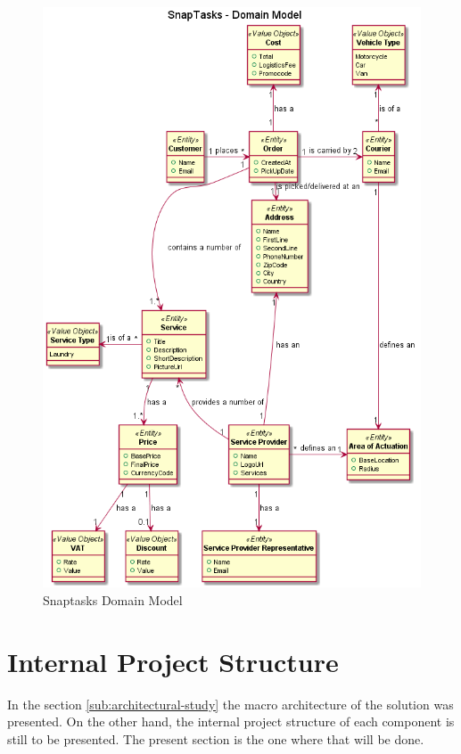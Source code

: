 \begin{figure}[ht]
\centering
\includegraphics[width=\textwidth,keepaspectratio]{chapters/Architectural_Overview/assets/SnapTasks-DomainModel.png}
\caption[SnapTasks Domain Model]{Snaptasks Domain Model}
\label{fig:domainModel}
\end{figure}

\clearpage
\section{Internal Project Structure}
\label{sec:internal-project-structure}

In the section \ref{sub:architectural-study} the macro architecture of the solution was presented. On the other hand, the internal project structure of each component is still to be presented. The present section is the one where that will be done.

